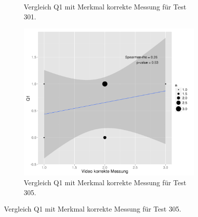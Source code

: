 \begin{figure}[htp]
\begin{subfigure}{0.32\textwidth}
    \caption{Vergleich Q1 mit Merkmal korrekte Messung für Test 301.}
    \label{fig:corVideoQ1301}
  \end{subfigure}
  \begin{subfigure}{0.32\textwidth}
      \includegraphics[width=1.0\linewidth]{graphics/corVideoQ1305.png}
    \caption{Vergleich Q1 mit Merkmal korrekte Messung für Test 305.}
    \label{fig:corVideoQ1305}
   \end{subfigure}
 

\end{figure}
